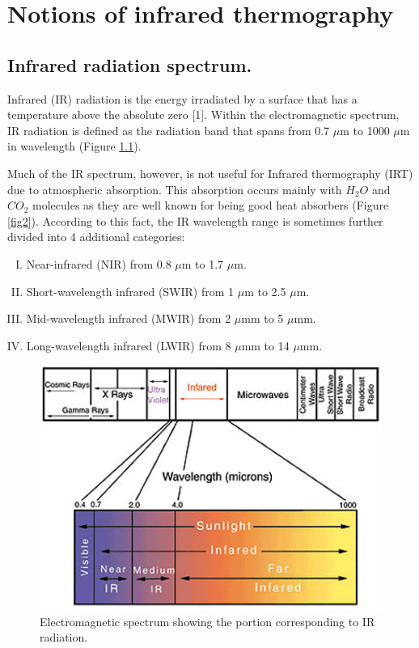\pagestyle{standard}

\chapter{Notions of infrared thermography}\label{chapter1}

	\thispagestyle{chapter-first-page}
	
	\section{Infrared radiation spectrum.}\label{section1.1}
	
		Infrared (IR) radiation is the energy irradiated by a surface that has a temperature above the absolute zero [1]. Within the electromagnetic spectrum, IR radiation is defined as the radiation band that spans from 0.7 $\mu$m to 1000 $\mu$m in wavelength (Figure \ref{fig1}).
		
		Much of the IR spectrum, however, is not useful for Infrared thermography (IRT) due to atmospheric absorption. This absorption occurs mainly with $H_{2}O$ and $CO_{2}$ molecules as they are well known for being good heat absorbers (Figure \ref{fig2}). According to this fact, the IR wavelength range is sometimes further divided into 4 additional categories:

		\begin{enumerate}[I.]
			\item Near-infrared (NIR) from 0.8 $\mu$m to 1.7 $\mu$m.
			\item Short-wavelength infrared (SWIR) from 1 $\mu$m to 2.5 $\mu$m.
			\item Mid-wavelength infrared (MWIR) from 2 $\mu$mm to 5 $\mu$mm.
			\item Long-wavelength infrared (LWIR) from 8 $\mu$mm to 14 $\mu$mm.
		\end{enumerate}
		
		\begin{figure}[ht!]
			\centering
			\captionsetup{justification=centering,margin=2cm}
			\includegraphics[scale=0.75]{Figures/Chapter01/lightspectrum}
			\caption{Electromagnetic spectrum showing the portion corresponding to IR radiation.}\label{fig1}
		\end{figure}
		
